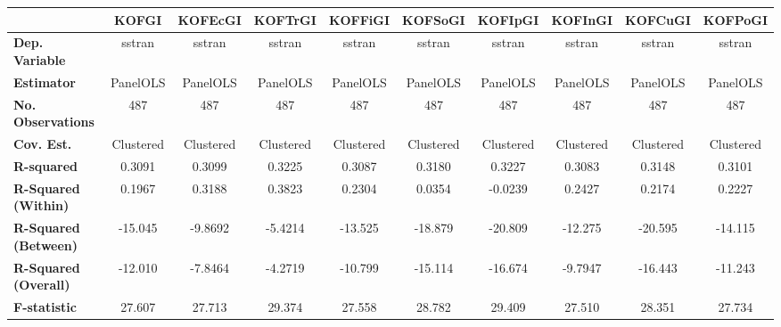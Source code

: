 \begin{center}
\begin{tabular}{lccccccccc}
\toprule
                                   & \textbf{KOFGI} & \textbf{KOFEcGI} & \textbf{KOFTrGI} & \textbf{KOFFiGI} & \textbf{KOFSoGI} & \textbf{KOFIpGI} & \textbf{KOFInGI} & \textbf{KOFCuGI} & \textbf{KOFPoGI}  \\
\midrule
\textbf{Dep. Variable}             &     sstran     &      sstran      &      sstran      &      sstran      &      sstran      &      sstran      &      sstran      &      sstran      &      sstran       \\
\textbf{Estimator}                 &    PanelOLS    &     PanelOLS     &     PanelOLS     &     PanelOLS     &     PanelOLS     &     PanelOLS     &     PanelOLS     &     PanelOLS     &     PanelOLS      \\
\textbf{No. Observations}          &      487       &       487        &       487        &       487        &       487        &       487        &       487        &       487        &       487         \\
\textbf{Cov. Est.}                 &   Clustered    &    Clustered     &    Clustered     &    Clustered     &    Clustered     &    Clustered     &    Clustered     &    Clustered     &    Clustered      \\
\textbf{R-squared}                 &     0.3091     &      0.3099      &      0.3225      &      0.3087      &      0.3180      &      0.3227      &      0.3083      &      0.3148      &      0.3101       \\
\textbf{R-Squared (Within)}        &     0.1967     &      0.3188      &      0.3823      &      0.2304      &      0.0354      &     -0.0239      &      0.2427      &      0.2174      &      0.2227       \\
\textbf{R-Squared (Between)}       &    -15.045     &     -9.8692      &     -5.4214      &     -13.525      &     -18.879      &     -20.809      &     -12.275      &     -20.595      &     -14.115       \\
\textbf{R-Squared (Overall)}       &    -12.010     &     -7.8464      &     -4.2719      &     -10.799      &     -15.114      &     -16.674      &     -9.7947      &     -16.443      &     -11.243       \\
\textbf{F-statistic}               &     27.607     &      27.713      &      29.374      &      27.558      &      28.782      &      29.409      &      27.510      &      28.351      &      27.734       \\

\end{tabular}
\end{center}
